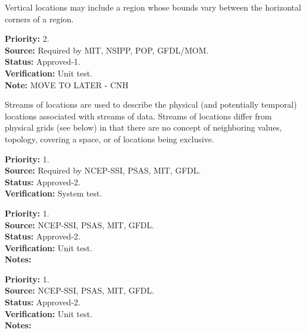 
  Vertical locations may include a region whose bounds vary between the
horizontal corners of a region.
\begin{reqlist}
{\bf Priority:} 2. \\
{\bf Source:} Required by MIT, NSIPP, POP, GFDL/MOM. \\
{\bf Status:} Approved-1. \\
{\bf Verification:} Unit test.\\
{\bf Note:} MOVE TO LATER - CNH
\end{reqlist}


Streams of locations are used to describe the physical (and potentially temporal)
locations associated with streams of data.  Streams of locations differ from
physical grids (see below) in that there are no concept of neighboring values,
topology, covering a space, or of locations being exclusive.
\begin{reqlist}
{\bf Priority:} 1. \\
{\bf Source:} Required by NCEP-SSI, PSAS, MIT, GFDL. \\
{\bf Status:} Approved-2. \\
{\bf Verification:} System test.
\end{reqlist}

\begin{reqlist}
{\bf Priority:} 1. \\
{\bf Source:} NCEP-SSI, PSAS, MIT, GFDL. \\
{\bf Status:} Approved-2. \\
{\bf Verification:} Unit test. \\
{\bf Notes:} 
\end{reqlist}

\begin{reqlist}
{\bf Priority:} 1. \\
{\bf Source:} NCEP-SSI, PSAS, MIT, GFDL. \\
{\bf Status:} Approved-2. \\
{\bf Verification:} Unit test. \\
{\bf Notes:} 
\end{reqlist}

